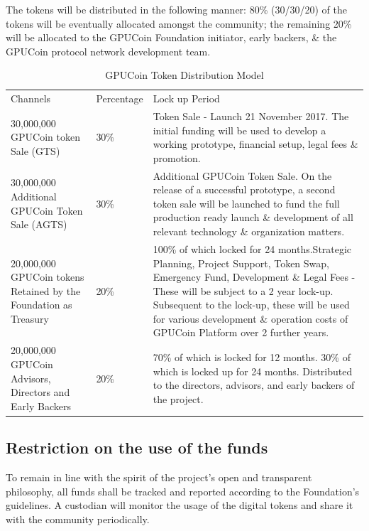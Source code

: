 \documentclass{article}
\begin{document}
 The tokens will be distributed in the following manner:
80\% (30/30/20) of the tokens will be eventually allocated amongst the community; the remaining 20\% will be allocated to the GPUCoin Foundation initiator, early backers, \& the GPUCoin protocol network development team.


\begin{table}[!htb]
\centering
\begin{tabular}{ |p{2.8cm}|p{2.5cm}|p{5cm}|}
\hline
\rowcolor{lightgray} \multicolumn{3}{|c|}{GPUCoin Token Distribution Model} \\
\hline
Channels & Percentage & Lock up Period \\
\hline
30,000,000 GPUCoin token Sale (GTS) & 30\% & Token Sale - Launch 21 November 2017. The initial funding will be used to develop a working prototype, financial setup, legal fees \& promotion.
 \\
 \hline
30,000,000 Additional GPUCoin Token Sale (AGTS) & 30\% & Additional GPUCoin Token Sale. On the release of a successful prototype, a second token sale will be launched to fund the full production ready launch \& development of all relevant technology \& organization matters.
\\
\hline
20,000,000 GPUCoin tokens Retained by the Foundation as Treasury & 20\% & 100\% of which locked for 24 months.Strategic Planning, Project Support, Token Swap, Emergency Fund, Development \& Legal Fees - These will be subject to a 2 year lock-up. Subsequent to the lock-up, these will be used for various development \& operation costs of GPUCoin Platform over 2 further years.
\\
\hline
20,000,000 GPUCoin Advisors, Directors and Early Backers & 20\% & 70\% of which is locked for 12 months. 30\% of which is locked up for 24 months. Distributed to the directors, advisors, and early backers of the
 project.
\\
 \hline
\end{tabular}
\caption{GPUCoin Token Distribution Model}
\label{table:hoot_token_distribution_model}
\end{table}

\subsection{Restriction on the use of the funds} %
\label{sub:restriction_on_the_use_of_the_funds}
To remain in line with the spirit of the project’s open and transparent philosophy, all funds shall be tracked and reported according to the Foundation’s guidelines. A custodian will monitor the usage of the digital tokens and share it with the community periodically.
\end{document}
